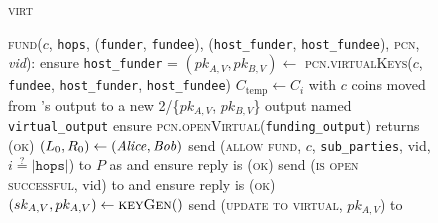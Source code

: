 \begin{figure}[H]
  \begin{processbox}{\textsc{virt}}
    \begin{algorithmic}[1]
      \State \textsc{fund}($c$, \texttt{hops}, (\texttt{funder},
      \texttt{fundee}), (\texttt{host\_funder}, \texttt{host\_fundee}),
      \textsc{pcn}, \textit{vid}):
      \Indent
        \State {}
      \EndIndent
      \State ensure \texttt{host\_funder} = \alice \: 
      \State $(pk_{A, V}, pk_{B, V}) \gets$ \textsc{pcn.virtualKeys}($c$,
      \texttt{fundee}, \texttt{host\_funder}, \texttt{host\_fundee})
      \State $C_{\mathrm{temp}} \gets C_i$ with $c$ coins moved
      from \alice's output to a new 2/\{$pk_{A, V}$, $pk_{B, V}$\} output named
      \texttt{virtual\_output} 
      \State ensure \textsc{pcn.openVirtual}(\texttt{funding\_output}) returns
      (\textsc{ok})
        \State $(L_0, R_0) \gets (\mathit{Alice}, \mathit{Bob})$
        \label{code:functionality:chan:skeleton:virtual:fund:init}
         
        \label{code:functionality:chan:skeleton:virtual:fund:for:allow:start}
          \State send (\textsc{allow fund}, $c$, \texttt{sub\_parties}, vid, $i
          \overset{?}{=} |\mathtt{hops}|$) to $P$ as \alice and ensure reply
          is (\textsc{ok})
          \label{code:functionality:chan:skeleton:virtual:fund:for:allow:send}
        \EndFor
        \label{code:functionality:chan:skeleton:virtual:fund:for:allow:end}
          \State send (\textsc{is open successful}, vid) to \adversary and ensure
          reply is (\textsc{ok})
          \State $(sk_{A, V}, pk_{A, V}) \gets \textsc{keyGen}()$
          \State send (\textsc{update to virtual}, $pk_{A, V}$) to \adversary

\end{algorithmic}
\end{processbox}
\end{figure}
